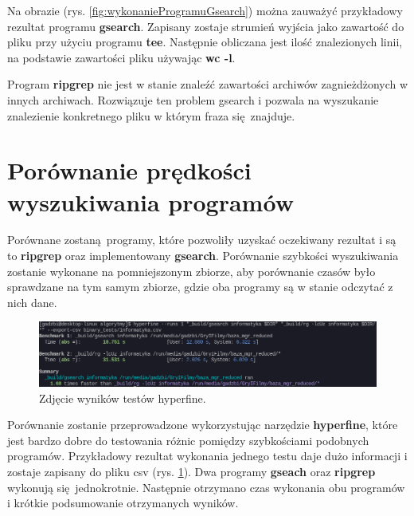 Na obrazie (rys. \ref{fig:wykonanieProgramuGsearch}) można zauważyć przykładowy
rezultat programu \textbf{gsearch}. Zapisany zostaje strumień wyjścia jako zawartość do pliku
przy użyciu programu \textbf{tee}. Następnie obliczana jest ilość znalezionych linii,
na podstawie zawartości pliku używając \textbf{wc -l}.

Program \textbf{ripgrep} nie jest w stanie znaleźć zawartości archiwów zagnieżdżonych w
innych archiwach. Rozwiązuje ten problem gsearch i pozwala na wyszukanie 
znalezienie konkretnego pliku w którym fraza się znajduje.

\section{Porównanie prędkości wyszukiwania programów}

Porównane zostaną programy, które pozwoliły uzyskać oczekiwany rezultat i są to
\textbf{ripgrep} oraz implementowany \textbf{gsearch}. 
Porównanie szybkości wyszukiwania zostanie wykonane na pomniejszonym zbiorze,
aby porównanie czasów było sprawdzane na tym samym zbiorze, gdzie oba programy
są w stanie odczytać z nich dane.

\begin{figure}[htbp]
    \centering
    \includegraphics[width=\textwidth]{./images/example-hyperfine-run.png}
    \caption{Zdjęcie wyników testów hyperfine.}
    \label{fig:hyperfineExample}
\end{figure}

Porównanie zostanie przeprowadzone wykorzystując narzędzie \textbf{hyperfine}, które
jest bardzo dobre do testowania różnic pomiędzy szybkościami podobnych programów.
Przykładowy rezultat wykonania jednego testu daje dużo informacji i zostaje
zapisany do pliku csv (rys. \ref{fig:hyperfineExample}). Dwa programy \textbf{gseach} 
oraz \textbf{ripgrep} wykonują się jednokrotnie. Następnie otrzymano czas wykonania obu
programów i krótkie podsumowanie otrzymanych wyników. 

